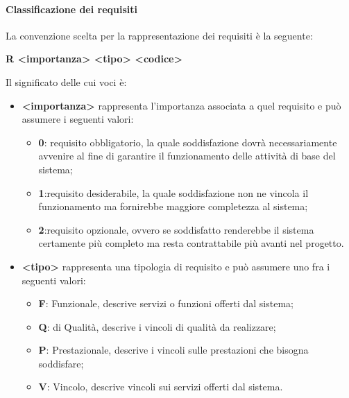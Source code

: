             \paragraph{Classificazione dei requisiti}
                La convenzione scelta per la rappresentazione dei requisiti è la seguente:\\
                \begin{center}
                    \textbf{R <importanza> <tipo> <codice>}
                \end{center}
                Il significato delle cui voci è:
                \begin{itemize}
                    \item\textbf{<importanza>} rappresenta l’importanza associata a quel requisito e può assumere i seguenti valori:
                        \begin{itemize}
                            \item\textbf{0}: requisito obbligatorio, la quale soddisfazione dovrà necessariamente avvenire al fine di garantire il funzionamento delle attività di base del sistema;
                            \item\textbf{1}:requisito desiderabile, la quale soddisfazione non ne vincola il funzionamento ma fornirebbe maggiore completezza al sistema;
                            \item\textbf{2}:requisito opzionale, ovvero se soddisfatto renderebbe il sistema certamente più completo ma resta contrattabile più avanti nel progetto.
                        \end{itemize}
                    \item\textbf{<tipo>} rappresenta una tipologia di requisito e può assumere uno fra i seguenti valori:
                        \begin{itemize}
                            \item\textbf{F}: Funzionale, descrive servizi o funzioni offerti dal sistema;
                            \item\textbf{Q}: di Qualità, descrive i vincoli di qualità da realizzare;
                            \item\textbf{P}: Prestazionale, descrive i vincoli sulle prestazioni che bisogna soddisfare;
                            \item\textbf{V}: Vincolo, descrive vincoli sui servizi offerti dal sistema.
                        \end{itemize}
                        

\end{itemize}
